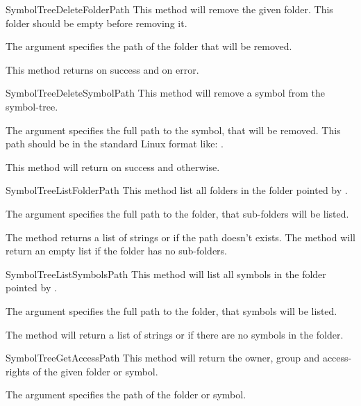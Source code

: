 \begin{methoddesc}[Core]{SymbolTreeDeleteFolder}{Path}
This method will remove the given folder. This folder should be empty before removing it.

The argument  specifies the path of the folder that will be removed. 

This method returns  on success and  on error.
\end{methoddesc}


\begin{methoddesc}[Core]{SymbolTreeDeleteSymbol}{Path}
This method will remove a symbol from the symbol-tree. 

The argument  specifies the full path to the symbol, that will be removed.
This path should be in the standard Linux format like: .

This method will return  on success and  otherwise.
\end{methoddesc}


\begin{methoddesc}[Core]{SymbolTreeListFolder}{Path}
This method list all folders in the folder pointed by .

The argument  specifies the full path to the folder, that sub-folders
will be listed. 

The method returns a list of strings or  if the path doesn't exists. The method will
return an empty list if the folder has no sub-folders.
\end{methoddesc}


\begin{methoddesc}[Core]{SymbolTreeListSymbols}{Path}
This method will list all symbols in the folder pointed by .

The argument  specifies the full path to the folder, that symbols
will be listed. 


The method will return a list of strings or  if there are no 
symbols in the folder.
\end{methoddesc}


\begin{methoddesc}[Core]{SymbolTreeGetAccess}{Path}
This method will return the owner, group and access-rights of the given folder or symbol.

The argument  specifies the path of the folder or symbol.
\end{methoddesc}


